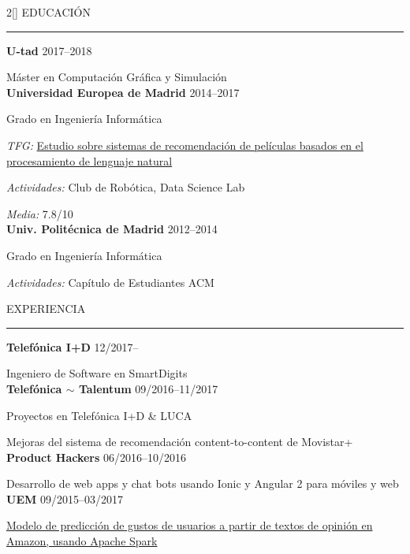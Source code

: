 \documentclass[a4paper, 12pt]{article}
\newenvironment{myparacol}[2][]{%
\begin{paracol}{#2}[#1]\setlength{\parindent}{0pt}}{%
\end{paracol}}
\begin{document}
\setlength{\columnsep}{24pt}
\begin{sloppypar}
\begin{myparacol}{2}
    EDUCACIÓN
    \vspace{1mm}
    \hrule
    \kern9pt
    \textbf{U-tad} \hfill 2017--2018

    Máster en Computación Gráfica y Simulación\\

    \textbf{Universidad Europea de Madrid} \hfill 2014--2017

    Grado en Ingeniería Informática

    \textit{TFG:} \href{https://github.com/hugo19941994/movie-pepper-doc/raw/master/thesis.pdf}{Estudio sobre sistemas de recomendación de películas basados en el procesamiento de lenguaje natural}

    \textit{Actividades:} Club de Robótica, Data Science Lab

    \textit{Media:} 7.8/10\\

    \textbf{Univ. Politécnica de Madrid} \hfill 2012--2014

    Grado en Ingeniería Informática

    \textit{Actividades:} Capítulo de Estudiantes ACM
    \\

    \switchcolumn{}

    EXPERIENCIA
    \vspace{1mm}
    \hrule
    \kern9pt

    \textbf{Telefónica I+D} \hfill 12/2017--

    Ingeniero de Software en SmartDigits\\

    \textbf{Telefónica $\sim$ Talentum} \hfill 09/2016--11/2017

    Proyectos en Telefónica I+D \& LUCA

    Mejoras del sistema de recomendación content-to-content de Movistar+\\

    \textbf{Product Hackers} \hfill 06/2016--10/2016

    Desarrollo de web apps y chat bots usando Ionic y Angular 2 para móviles y web\\

    \textbf{UEM} \hfill 09/2015--03/2017

    \href{https://www.researchgate.net/publication/314142014_Prediction_of_User_Opinion_for_Products_-_A_Bag-of-Words_and_Collaborative_Filtering_based_Approach}{Modelo de predicción de gustos de usuarios a partir de textos de opinión en Amazon, usando Apache Spark}


\end{myparacol}
\end{sloppypar}
\end{document}
